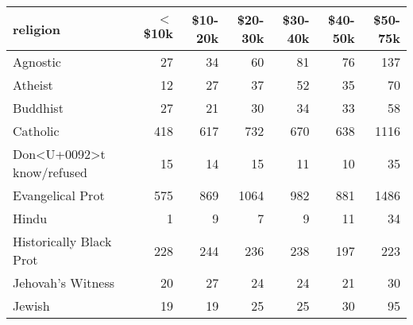 \begin{tabular}{lrrrrrr}
  \toprule
 religion & $<$\$10k & \$10-20k & \$20-30k & \$30-40k & \$40-50k & \$50-75k \\ 
  \midrule
  Agnostic &  27 &  34 &  60 &  81 &  76 & 137 \\ 
  Atheist &  12 &  27 &  37 &  52 &  35 &  70 \\ 
  Buddhist &  27 &  21 &  30 &  34 &  33 &  58 \\ 
  Catholic & 418 & 617 & 732 & 670 & 638 & 1116 \\ 
  Don<U+0092>t know/refused &  15 &  14 &  15 &  11 &  10 &  35 \\ 
  Evangelical Prot & 575 & 869 & 1064 & 982 & 881 & 1486 \\ 
  Hindu &   1 &   9 &   7 &   9 &  11 &  34 \\ 
  Historically Black Prot & 228 & 244 & 236 & 238 & 197 & 223 \\ 
  Jehovah's Witness &  20 &  27 &  24 &  24 &  21 &  30 \\ 
  Jewish &  19 &  19 &  25 &  25 &  30 &  95 \\ 
   \bottomrule
\end{tabular}

